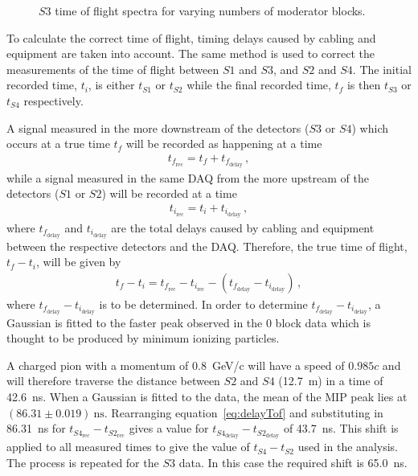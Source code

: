 \begin{figure}[ht]
  \begin{adjustbox}{max totalsize={.8\textwidth}{.5\textheight},center}
    
  \end{adjustbox}
  \caption{$\mathit{S3}$ time of flight spectra for varying numbers of moderator blocks.}
  \label{fig:s3tof}
\end{figure}

To calculate the correct time of flight, timing delays caused by cabling and equipment are taken into account.
The same method is used to correct the measurements of the time of flight between $\mathit{S1}$ and $\mathit{S3}$, and $\mathit{S2}$ and $\mathit{S4}$.
The initial recorded time, $t_i$, is either $t_{\mathit{S1}}$ or $t_{\mathit{S2}}$ while the final recorded time, $t_f$ is then $t_{\mathit{S3}}$ or $t_{\mathit{S4}}$ respectively.

A signal measured in the more downstream of the detectors ($\mathit{S3}$ or $\mathit{S4}$) which occurs at a true time $t_f$ will be recorded as happening at a time
\begin{align}
  t_{f_{\text{rec}}} = t_f + t_{f_{\text{delay}}} \,,
  \label{eq:delayS4}
\end{align}
while a signal measured in the same DAQ from the more upstream of the detectors ($\mathit{S1}$ or $\mathit{S2}$) will be recorded at a time
\begin{align}
  t_{i_{\text{rec}}} = t_{i} + t_{i_{\text{delay}}} \,,
  \label{eq:delayS2}
\end{align}
where $t_{f_{\text{delay}}}$ and $t_{i_{\text{delay}}}$ are the total delays caused by cabling and equipment between the respective detectors and the DAQ.
Therefore, the true time of flight, $t_{f} - t_{i}$, will be given by
\begin{align}
  t_{f} - t_{i} = t_{f_{\text{rec}}} - t_{i_{\text{rec}}} - \left( t_{f_{\text{delay}}} - t_{i_{\text{delay}}} \right) \,,
  \label{eq:delayTof}
\end{align}
where $t_{f_{\text{delay}}} - t_{i_{\text{delay}}}$ is to be determined.
In order to determine $t_{f_{\text{delay}}} - t_{i_{\text{delay}}}$, a Gaussian is fitted to the faster peak observed in the 0 block data which is thought to be produced by minimum ionizing particles.

A charged pion with a momentum of 0.8~GeV/c will have a speed of $0.985c$ and will therefore traverse the distance between $\mathit{S2}$ and $\mathit{S4}$ (12.7~m) in a time of 42.6~ns.
When a Gaussian is fitted to the data, the mean of the MIP peak lies at $(86.31 \pm 0.019)~\text{ns}$.
Rearranging equation~\ref{eq:delayTof} and substituting in 86.31~ns for $t_{\mathit{S4}_{\text{rec}}} - t_{\mathit{S2}_{\text{rec}}}$ gives a value for $t_{\mathit{S4}_{\text{delay}}} - t_{\mathit{S2}_{\text{delay}}}$ of 43.7~ns.
This shift is applied to all measured times to give the value of $t_{\mathit{S4}} - t_{\mathit{S2}}$ used in the analysis.
The process is repeated for the $\mathit{S3}$ data.
In this case the required shift is 65.0~ns.


